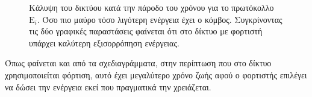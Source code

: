 \begin{figure}[H]
  \centering
  \caption{Κάλυψη του δικτύου κατά την πάροδο του χρόνου για το πρωτόκολλο $\text{E}_{i}$. Όσο πιο μαύρο τόσο λιγότερη ενέργεια έχει ο κόμβος. Συγκρίνοντας τις δύο
γραφικές παραστάσεις φαίνεται ότι στο δίκτυο με φορτιστή υπάρχει καλύτερη εξισορρόπηση ενέργειας.}
  \label{fig:1exp_4_3}
\end{figure}

Όπως φαίνεται και από τα σχεδιαγράμματα, στην περίπτωση που στο δίκτυο χρησιμοποιείται φόρτιση, αυτό έχει μεγαλύτερο χρόνο ζωής αφού ο φορτιστής επιλέγει να δώσει
την ενέργεια εκεί που πραγματικά την χρειάζεται.







